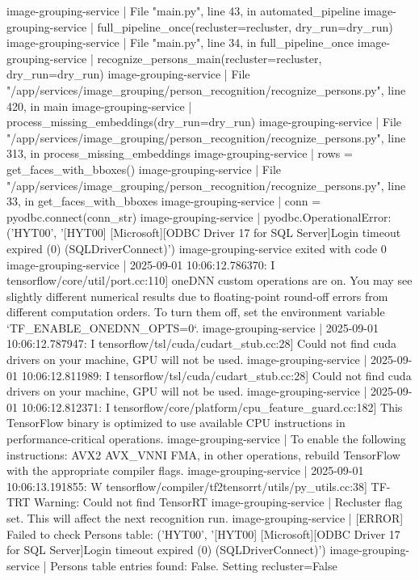 image-grouping-service  |   File "main.py", line 43, in automated_pipeline
image-grouping-service  |     full_pipeline_once(recluster=recluster, dry_run=dry_run)
image-grouping-service  |   File "main.py", line 34, in full_pipeline_once
image-grouping-service  |     recognize_persons_main(recluster=recluster, dry_run=dry_run)
image-grouping-service  |   File "/app/services/image_grouping/person_recognition/recognize_persons.py", line 420, in main
image-grouping-service  |     process_missing_embeddings(dry_run=dry_run)
image-grouping-service  |   File "/app/services/image_grouping/person_recognition/recognize_persons.py", line 313, in process_missing_embeddings
image-grouping-service  |     rows = get_faces_with_bboxes()
image-grouping-service  |   File "/app/services/image_grouping/person_recognition/recognize_persons.py", line 33, in get_faces_with_bboxes
image-grouping-service  |     conn = pyodbc.connect(conn_str)
image-grouping-service  | pyodbc.OperationalError: ('HYT00', '[HYT00] [Microsoft][ODBC Driver 17 for SQL Server]Login timeout expired (0) (SQLDriverConnect)')
image-grouping-service exited with code 0
image-grouping-service  | 2025-09-01 10:06:12.786370: I tensorflow/core/util/port.cc:110] oneDNN custom operations are on. You may see slightly different numerical results due to floating-point round-off errors from different computation orders. To turn them off, set the environment variable `TF_ENABLE_ONEDNN_OPTS=0`.
image-grouping-service  | 2025-09-01 10:06:12.787947: I tensorflow/tsl/cuda/cudart_stub.cc:28] Could not find cuda drivers on your machine, GPU will not be used.
image-grouping-service  | 2025-09-01 10:06:12.811989: I tensorflow/tsl/cuda/cudart_stub.cc:28] Could not find cuda drivers on your machine, GPU will not be used.
image-grouping-service  | 2025-09-01 10:06:12.812371: I tensorflow/core/platform/cpu_feature_guard.cc:182] This TensorFlow binary is optimized to use available CPU instructions in performance-critical operations.
image-grouping-service  | To enable the following instructions: AVX2 AVX_VNNI FMA, in other operations, rebuild TensorFlow with the appropriate compiler flags.
image-grouping-service  | 2025-09-01 10:06:13.191855: W tensorflow/compiler/tf2tensorrt/utils/py_utils.cc:38] TF-TRT Warning: Could not find TensorRT
image-grouping-service  | Recluster flag set. This will affect the next recognition run.
image-grouping-service  | [ERROR] Failed to check Persons table: ('HYT00', '[HYT00] [Microsoft][ODBC Driver 17 for SQL Server]Login timeout expired (0) (SQLDriverConnect)')
image-grouping-service  | Persons table entries found: False. Setting recluster=False
